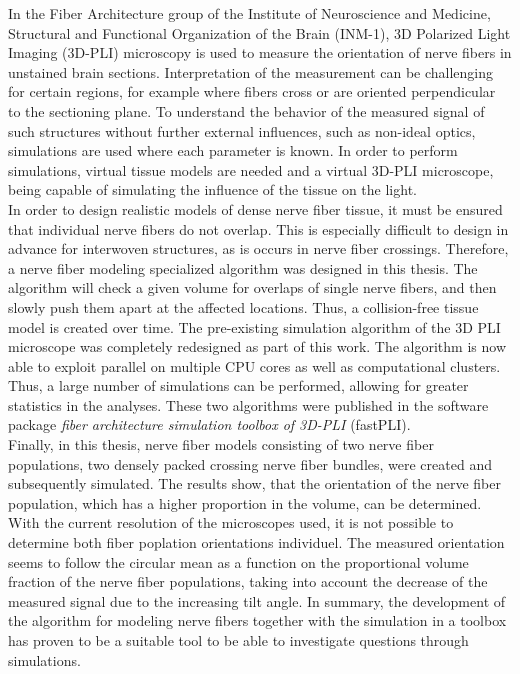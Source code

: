 %
In the Fiber Architecture group of the Institute of Neuroscience and Medicine, Structural and Functional Organization of the Brain (INM-1), 3D Polarized Light Imaging (3D-PLI) microscopy is used to measure the orientation of nerve fibers in unstained brain sections.
Interpretation of the measurement can be challenging for certain regions, for example where fibers cross or are oriented perpendicular to the sectioning plane.
To understand the behavior of the measured signal of such structures without further external influences, such as non-ideal optics, simulations are used where each parameter is known.
In order to perform simulations, virtual tissue models are needed and a virtual 3D-PLI microscope, being capable of simulating the influence of the tissue on the light.
\\
% 
In order to design realistic models of dense nerve fiber tissue, it must be ensured that individual nerve fibers do not overlap.
This is especially difficult to design in advance for interwoven structures, as is occurs in nerve fiber crossings.
Therefore, a nerve fiber modeling specialized algorithm was designed in this thesis.
The algorithm will check a given volume for overlaps of single nerve fibers, and then slowly push them apart at the affected locations.
Thus, a collision-free tissue model is created over time.
The pre-existing simulation algorithm of the 3D PLI microscope was completely redesigned as part of this work.
The algorithm is now able to exploit parallel on multiple CPU cores as well as computational clusters.
Thus, a large number of simulations can be performed, allowing for greater statistics in the analyses.
These two algorithms were published in the software package \textit{fiber architecture simulation toolbox of 3D-PLI} (fastPLI).
\\
% 
Finally, in this thesis, nerve fiber models consisting of two nerve fiber populations, \ie{} two densely packed crossing nerve fiber bundles, were created and subsequently simulated.
The results show, that the orientation of the nerve fiber population, which has a higher proportion in the volume, can be determined.
With the current resolution of the microscopes used, it is not possible to determine both fiber poplation orientations individuel.
The measured orientation seems to follow the circular mean as a function on the proportional volume fraction of the nerve fiber populations, taking into account the decrease of the measured signal due to the increasing tilt angle.
In summary, the development of the algorithm for modeling nerve fibers together with the simulation in a toolbox has proven to be a suitable tool to be able to investigate questions through simulations.
